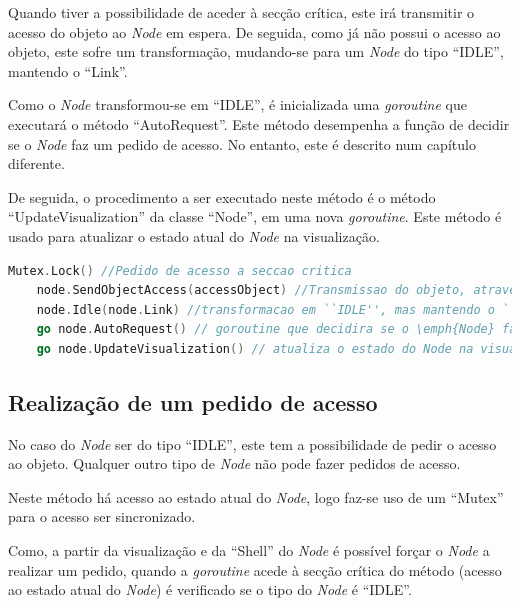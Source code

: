 Quando tiver a possibilidade de aceder à secção crítica, este irá transmitir o acesso do objeto ao \emph{Node} em espera.
De seguida, como já não possui o acesso ao objeto, este sofre um transformação, mudando-se para um \emph{Node}
do tipo ``IDLE'', mantendo o ``Link''.

Como o \emph{Node} transformou-se em ``IDLE'', é inicializada uma \emph{goroutine} que executará o método ``AutoRequest''.
Este método desempenha a função de decidir se o \emph{Node} faz um pedido de acesso. 
No entanto, este é descrito num capítulo diferente.

De seguida, o procedimento a ser executado neste método é o método ``UpdateVisualization'' da classe ``Node'',
em uma nova \emph{goroutine}.
Este método é usado para atualizar o estado atual do \emph{Node} na visualização.


\begin{lstlisting}[caption={Acesso à secção crítica, transmição do Objeto, transformação em \emph{Node} ``IDLE'', \emph{goroutine} de decisão de pedido, e atualização na visualização},language=Go]
	Mutex.Lock() //Pedido de acesso a seccao critica
	node.SendObjectAccess(accessObject) //Transmissao do objeto, atraves do envio do objeto ``accessObject''
	node.Idle(node.Link) //transformacao em ``IDLE'', mas mantendo o ``Link''
	go node.AutoRequest() // goroutine que decidira se o \emph{Node} faz um pedido de acesso
	go node.UpdateVisualization() // atualiza o estado do Node na visualizacao

\end{lstlisting}


\subsection{Realização de um pedido de acesso}
No caso do \emph{Node} ser do tipo ``IDLE'', este tem a possibilidade de pedir o acesso ao objeto.
Qualquer outro tipo de \emph{Node} não pode fazer pedidos de acesso.

Neste método há acesso ao estado atual do \emph{Node},
logo faz-se uso de um ``Mutex'' para o acesso ser sincronizado.

Como, a partir da visualização e da ``Shell'' do \emph{Node} é possível forçar o \emph{Node} 
a realizar um pedido, quando a \emph{goroutine} acede à secção crítica do método (acesso ao estado atual do \emph{Node})
é verificado se o tipo do \emph{Node} é ``IDLE''.


